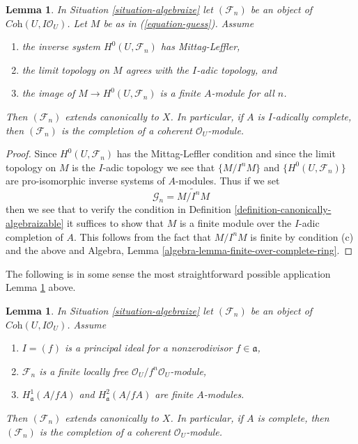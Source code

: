 \documentclass[10pt,a4paper]{amsart}
\theoremstyle{plain}
\newtheorem{lemma}[subsection]{Lemma}
\theoremstyle{definition}
\theoremstyle{remark}
\numberwithin{equation}{subsection}
\begin{document}
\begin{lemma}
\label{lemma-when-done}
In Situation \ref{situation-algebraize} let $(\mathcal{F}_n)$ be an object
of $\textit{Coh}(U, I\mathcal{O}_U)$. Let $M$ be as in (\ref{equation-guess}).
Assume
\begin{enumerate}
\item[(a)] the inverse system $H^0(U, \mathcal{F}_n)$ has Mittag-Leffler,
\item[(b)] the limit topology on $M$ agrees with the $I$-adic topology, and
\item[(c)] the image of $M \to H^0(U, \mathcal{F}_n)$ is a finite $A$-module
for all $n$.
\end{enumerate}
Then $(\mathcal{F}_n)$ extends canonically to $X$.
In particular, if $A$ is $I$-adically complete, then
$(\mathcal{F}_n)$ is the completion of a coherent $\mathcal{O}_U$-module.
\end{lemma}

\begin{proof}
Since $H^0(U, \mathcal{F}_n)$ has the Mittag-Leffler condition
and since the limit topology on $M$ is the $I$-adic topology
we see that $\{M/I^nM\}$ and $\{H^0(U, \mathcal{F}_n)\}$
are pro-isomorphic inverse systems of $A$-modules.
Thus if we set
$$
\mathcal{G}_n = \widetilde{M/I^n M}
$$
then we see that to verify the condition in
Definition \ref{definition-canonically-algebraizable}
it suffices to show that $M$ is a finite module over the
$I$-adic completion of $A$. This follows from
the fact that $M/I^n M$ is finite by condition (c)
and the above and
Algebra, Lemma \ref{algebra-lemma-finite-over-complete-ring}.
\end{proof}

\noindent
The following is in some sense the most straightforward possible application
Lemma \ref{lemma-when-done} above.

\begin{lemma}
\label{lemma-algebraization-principal-variant}
In Situation \ref{situation-algebraize} let
$(\mathcal{F}_n)$ be an object of $\textit{Coh}(U, I\mathcal{O}_U)$.
Assume
\begin{enumerate}
\item $I = (f)$ is a principal ideal for a nonzerodivisor $f \in \mathfrak a$,
\item $\mathcal{F}_n$ is a finite locally free
$\mathcal{O}_U/f^n\mathcal{O}_U$-module,
\item $H^1_\mathfrak a(A/fA)$ and $H^2_\mathfrak a(A/fA)$
are finite $A$-modules.
\end{enumerate}
Then $(\mathcal{F}_n)$ extends canonically to $X$. In particular, if $A$
is complete, then $(\mathcal{F}_n)$ is the completion of a coherent
$\mathcal{O}_U$-module.
\end{lemma}
\end{document}
